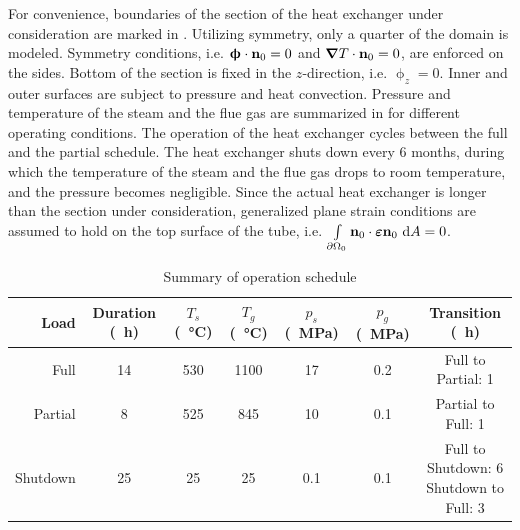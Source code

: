 For convenience, boundaries of the section of the heat exchanger under consideration are marked in . Utilizing symmetry, only a quarter of the domain is modeled. Symmetry conditions, i.e. $\boldsymbol{\upphi} \cdot \textbf{n}_0 = 0$ and $\boldsymbol{\nabla} T \cdot \textbf{n}_0 = 0$, are enforced on the sides. Bottom of the section is fixed in the $z$-direction, i.e. $\upphi_z = 0$. Inner and outer surfaces are subject to pressure and heat convection.
Pressure and temperature of the steam and the flue gas are summarized in  for different operating conditions. The operation of the heat exchanger cycles between the full and the partial schedule. The heat exchanger shuts down every 6 months, during which the temperature of the steam and the flue gas drops to room temperature, and the pressure becomes negligible. Since the actual heat exchanger is longer than the section under consideration, generalized plane strain conditions are assumed to hold on the top surface of the tube, i.e. $\int\limits_{{\partial \Omega}_0} \textbf{n}_0 \cdot \boldsymbol{\varepsilon} \textbf{n}_0 \text{ d}A = 0 $.



\begin{table}[!htb]
  \small
  \centering
  \caption{Summary of operation schedule}
  \label{table: Chapter5/spallation/schedule}
  \begin{tabular}{r c c c c c c}
    \toprule
    Load     & Duration (\SI{}{\hour}) & $T_s$ (\SI{}{\celsius}) & $T_g$ (\SI{}{\celsius}) & $p_s$ (\SI{}{\mega\pascal}) & $p_g$ (\SI{}{\mega\pascal}) & Transition (\SI{}{\hour})        \\
    \midrule
    Full     & 14                      & 530                     & 1100                    & 17                          & 0.2                         & Full to Partial: 1               \\
    Partial  & 8                       & 525                     & 845                     & 10                          & 0.1                         & Partial to Full: 1               \\
    Shutdown & 25                      & 25                      & 25                      & 0.1                         & 0.1                         & \makecell[t]{Full to Shutdown: 6 \\ Shutdown to Full: 3}       \\
    \bottomrule
  \end{tabular}
\end{table}

